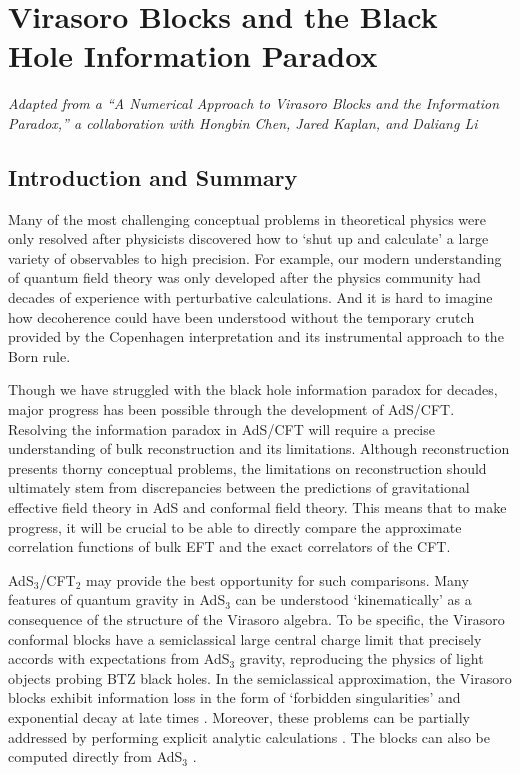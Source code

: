 \chapter{Virasoro Blocks and the Black Hole Information Paradox}
\label{chap:bh}

\emph{Adapted from a ``A Numerical Approach to Virasoro Blocks
and the Information Paradox,'' a collaboration with Hongbin Chen, Jared Kaplan, 
and Daliang Li}

\section{Introduction and Summary}

 

Many of the most challenging conceptual problems in theoretical physics were only resolved after physicists discovered how to `shut up and calculate' a large variety of observables to high precision.  For example, our modern understanding of quantum field theory was only developed after the physics community had decades of experience with perturbative calculations.  And it is hard to imagine how decoherence could have been understood without the temporary crutch provided by the Copenhagen interpretation and its instrumental approach to the Born rule.

Though we have struggled with the black hole information paradox for decades,  major progress has been possible through the development of AdS/CFT.  Resolving the information paradox in AdS/CFT will require a precise understanding of bulk reconstruction and its limitations.  Although reconstruction presents thorny conceptual problems, the limitations on reconstruction  should ultimately stem from discrepancies between the predictions of gravitational effective field theory in AdS and conformal field theory. This means that to make progress, it will be crucial to be able to directly compare the approximate correlation functions of bulk EFT and the exact correlators of the CFT.  

AdS$_3$/CFT$_2$ may provide the best opportunity for such comparisons.
Many features of quantum gravity in AdS$_3$ can be understood  `kinematically' as a consequence of the structure of the Virasoro algebra.  To be specific, the Virasoro conformal blocks have a semiclassical large central charge limit that precisely accords with expectations from AdS$_3$ gravity, reproducing the physics of light objects probing BTZ black holes.  In the semiclassical approximation, the Virasoro blocks exhibit information loss in the form of `forbidden singularities' and exponential decay at late times \cite{Fitzpatrick:2014vua, Fitzpatrick:2015zha, Fitzpatrick:2015foa, Fitzpatrick:2015dlt, Fitzpatrick:2016mjq, Anous:2016kss}.  Moreover, these problems can be partially addressed by performing explicit analytic calculations \cite{Fitzpatrick:2016ive}.  The  blocks can also be computed directly from AdS$_3$ \cite{KrausBlocks, Hijano:2015qja, Besken:2016ooo, Alkalaev:2015wia, Alkalaev:2015lca, Hulik:2016ifr, Fitzpatrick:2016mtp, Besken:2017fsj}.


